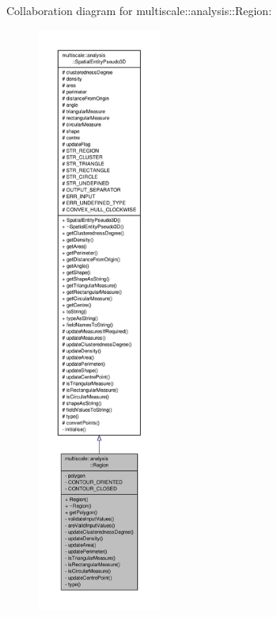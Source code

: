 Collaboration diagram for multiscale\-:\-:analysis\-:\-:Region\-:
\nopagebreak
\begin{figure}[H]
\begin{center}
\leavevmode
\includegraphics[height=550pt]{classmultiscale_1_1analysis_1_1Region__coll__graph}
\end{center}
\end{figure}
